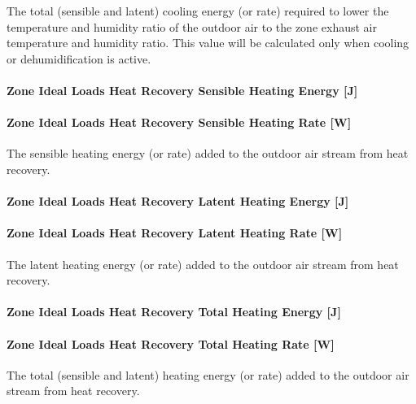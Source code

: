 The total (sensible and latent) cooling energy (or rate) required to lower the temperature and humidity ratio of the outdoor air to the zone exhaust air temperature and humidity ratio. This value will be calculated only when cooling or dehumidification is active.

\paragraph{Zone Ideal Loads Heat Recovery Sensible Heating Energy {[}J{]}}\label{zone-ideal-loads-heat-recovery-sensible-heating-energy-j}

\paragraph{Zone Ideal Loads Heat Recovery Sensible Heating Rate {[}W{]}}\label{zone-ideal-loads-heat-recovery-sensible-heating-rate-w}

The sensible heating energy (or rate) added to the outdoor air stream from heat recovery.

\paragraph{Zone Ideal Loads Heat Recovery Latent Heating Energy {[}J{]}}\label{zone-ideal-loads-heat-recovery-latent-heating-energy-j}

\paragraph{Zone Ideal Loads Heat Recovery Latent Heating Rate {[}W{]}}\label{zone-ideal-loads-heat-recovery-latent-heating-rate-w}

The latent heating energy (or rate) added to the outdoor air stream from heat recovery.

\paragraph{Zone Ideal Loads Heat Recovery Total Heating Energy {[}J{]}}\label{zone-ideal-loads-heat-recovery-total-heating-energy-j}

\paragraph{Zone Ideal Loads Heat Recovery Total Heating Rate {[}W{]}}\label{zone-ideal-loads-heat-recovery-total-heating-rate-w}

The total (sensible and latent) heating energy (or rate) added to the outdoor air stream from heat recovery.


